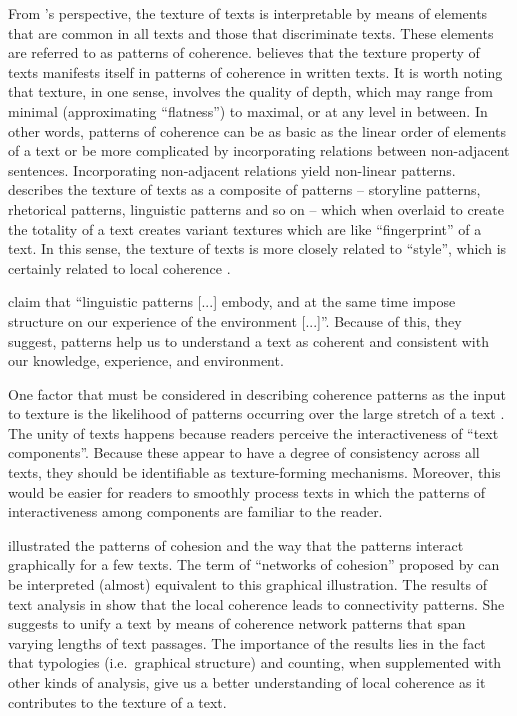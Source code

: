 From 's perspective, the texture of texts is interpretable by means of elements that are common in all texts and those that discriminate texts. 
These elements are referred to as patterns of coherence. 
 believes that the texture property of texts manifests itself in patterns of coherence in written texts. 
It is worth noting that texture, in one sense, involves the quality of depth, which may range from minimal (approximating ``flatness'') to maximal, or at any level in between. 
In other words, patterns of coherence can be as basic as the linear order of elements of a text or be more complicated by incorporating relations between non-adjacent sentences. 
Incorporating non-adjacent relations yield non-linear patterns. 
 describes the texture of texts as a composite of patterns -- storyline patterns, rhetorical patterns, linguistic patterns and so on -- which when overlaid to create the totality of a text creates variant textures which are like ``fingerprint'' of a text. 
In this sense, the texture of texts is more closely related to ``style'', which is certainly related to local coherence \cite{barzilay08}. 

 claim that ``linguistic patterns  [...] embody, and at the same time impose structure on our experience of the environment [...]''.
Because of this, they suggest, patterns help us to understand a text as coherent and consistent with our knowledge, experience, and environment. 

One factor that must be considered in describing coherence patterns as the input to texture is the likelihood of patterns occurring over the large stretch of a text \cite{stoddard91}.  
The unity of texts happens because readers perceive the interactiveness of ``text components''. 
Because these appear to have a degree of consistency across all texts, they should be identifiable as texture-forming mechanisms.
Moreover, this would be easier for readers to smoothly process texts in which the patterns of interactiveness among components are familiar to the reader.  

 illustrated the patterns of cohesion and the way that the patterns interact graphically for a few texts. 
The term of ``networks of cohesion'' proposed by  can be interpreted (almost) equivalent to this graphical illustration. 
The results of text analysis in  show that the local coherence leads to connectivity patterns.
She suggests to unify a text by means of coherence network patterns that span varying lengths of text passages. 
The importance of the results lies in the fact that typologies (i.e.\ graphical structure) and counting, when supplemented with other kinds of analysis, give us a better understanding of local coherence as it contributes to the texture of a text. 

